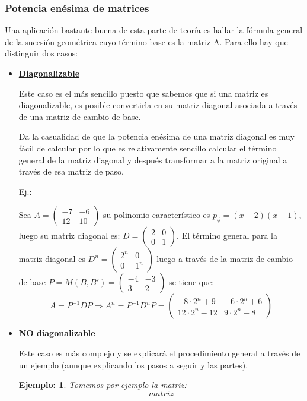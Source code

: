 \documentclass[10pt,a4paper,openright]{book}
\theoremstyle{break}
\newtheorem*{ej}{\underline{Ejemplo}:}
\begin{document}
\subsubsection{Potencia enésima de matrices}
Una aplicación bastante buena de esta parte de teoría es hallar la fórmula general de la sucesión geométrica cuyo término base es la matriz A. Para ello hay que distinguir dos casos:
\begin{itemize}
\item \underline{\textbf{Diagonalizable}}

Este caso es el más sencillo puesto que sabemos que si una matriz es diagonalizable, es posible convertirla en su matriz diagonal asociada a través de una matriz de cambio de base.

Da la casualidad de que la potencia enésima de una matriz diagonal es muy fácil de calcular por lo que es relativamente sencillo calcular el término general de la matriz diagonal y después transformar a la matriz original a través de esa matriz de paso.

Ej.:

Sea $A=\begin{pmatrix}-7&-6\\12&10\end{pmatrix}$ su polinomio característico es $p_\phi=(x-2)(x-1)$, luego su matriz diagonal es:
$D=\begin{pmatrix}2&0\\0&1\end{pmatrix}$. El término general para la matriz diagonal es $D^n=\begin{pmatrix}2^n&0\\0&1^n\end{pmatrix}$ luego a través de la matriz de cambio de base $P=M(B,B')=\begin{pmatrix}
-4&-3\\3&2\end{pmatrix}$ se tiene que:
$$A=P^{-1}DP\Rightarrow A^n=P^{-1}D^nP=\begin{pmatrix}
 -8\cdot 2^n+9&	-6\cdot 2^n+6\\
12\cdot 2^n-12&	 9\cdot 2^n-8
\end{pmatrix}
$$

\item \underline{\textbf{NO diagonalizable}}

Este caso es más complejo y se explicará el procedimiento general a través de un ejemplo (aunque explicando los pasos a seguir y las partes).
\begin{ej}
Tomemos por ejemplo la matriz:
$$matriz$$

\end{ej}
\end{itemize}
\end{document}
